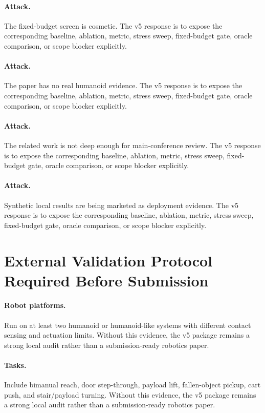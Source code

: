 \documentclass{article}
\begin{document}
\paragraph{Attack.} The fixed-budget screen is cosmetic. The v5 response is to expose the corresponding baseline, ablation, metric, stress sweep, fixed-budget gate, oracle comparison, or scope blocker explicitly.
\paragraph{Attack.} The paper has no real humanoid evidence. The v5 response is to expose the corresponding baseline, ablation, metric, stress sweep, fixed-budget gate, oracle comparison, or scope blocker explicitly.
\paragraph{Attack.} The related work is not deep enough for main-conference review. The v5 response is to expose the corresponding baseline, ablation, metric, stress sweep, fixed-budget gate, oracle comparison, or scope blocker explicitly.
\paragraph{Attack.} Synthetic local results are being marketed as deployment evidence. The v5 response is to expose the corresponding baseline, ablation, metric, stress sweep, fixed-budget gate, oracle comparison, or scope blocker explicitly.
\clearpage
\section{External Validation Protocol Required Before Submission}
\paragraph{Robot platforms.} Run on at least two humanoid or humanoid-like systems with different contact sensing and actuation limits. Without this evidence, the v5 package remains a strong local audit rather than a submission-ready robotics paper.
\paragraph{Tasks.} Include bimanual reach, door step-through, payload lift, fallen-object pickup, cart push, and stair/payload turning. Without this evidence, the v5 package remains a strong local audit rather than a submission-ready robotics paper.
\end{document}
